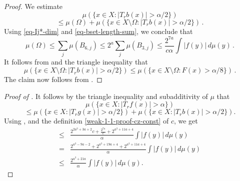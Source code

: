 \begin{proof}
    \leanok
    We estimate
    \begin{equation*}
        \mu\left(\{x\in X: |T_r b(x)|>\alpha/2\}\right)
    \end{equation*}
    \begin{equation}
        \label{eq-set-dec-2}
        \le \mu (\Omega) +  \mu\left(\{x\in X\setminus\Omega: |T_r b(x)|>{\alpha}/2\}\right)\,.
    \end{equation}
    Using \eqref{eq-Ij*-dim} and \eqref{eq-bset-length-sum}, we conclude that
    \begin{equation}
        \label{eq-omega-bd}
        \mu(\Omega) \le \sum_{j} \mu (B_{6,j})
        \le 2^a \sum_j \mu(B_{3,j}) \le \frac{2^{7a}}{c\alpha} \int |f(y)|\, d\mu(y)\,.
    \end{equation}
    It follows from  and the triangle inequality that
    \begin{equation}
        \label{eq-set-dec-3}
        \mu({\{x\in X\setminus\Omega: |T_r b(x)|>\alpha/2\}}) \le \mu(\{x\in X\setminus\Omega: F(x)> \alpha/8\})\,.
    \end{equation}
    The claim now follows from .
\end{proof}

\begin{proof}[Proof of ]
\leanok
{}
It follows by the triangle inequality and subadditivity of $\mu$ that
\begin{equation*}
    \mu\left(\{x\in X: |T_r f(x)|>\alpha\}\right)
\end{equation*}
\begin{equation*}
\label{eq-set-dec-1}
 \le \mu\left(\{x\in X: |T_r g(x)|>{\alpha}/2\}\right) +  \mu\left(\{x\in X: |T_r b(x)|>{\alpha}/2\}\right).
\end{equation*}
Using ,  and the definition \eqref{weak-1-1-proof-cz-const} of $c$, we get
\begin{align*}
    \le& \frac{2^{2a^3+3a+2}c + \frac{2^{7a}}{c} + 2^{a^3+11a+4}}{\alpha} \int |f(y)|\, d\mu(y) \\
    =& \frac{2^{a^3-9a-2} + 2^{a^3+19a+4} + 2^{a^3+11a+4}}{\alpha} \int |f(y)|\, d\mu(y) \\
    \le& \frac{2^{a^3 + 21a}}{\alpha} \int |f(y)|\, d\mu(y).
\end{align*}
\end{proof}


